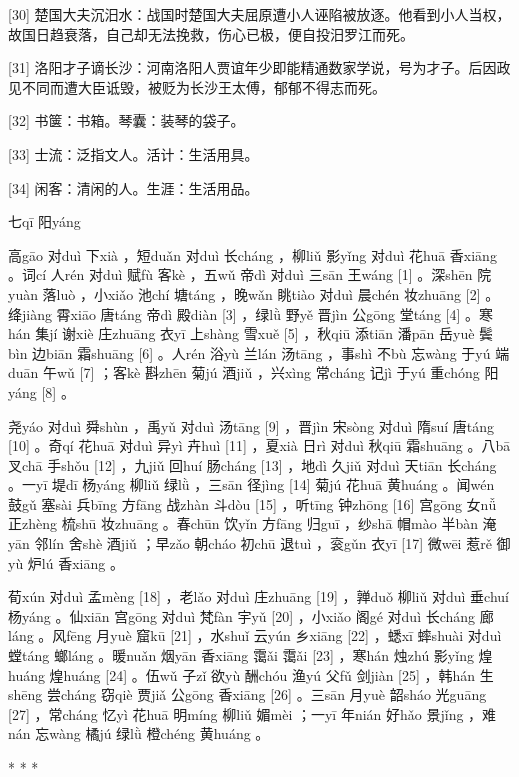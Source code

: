 \documentclass[12pt,UTF8]{ctexbook}
\begin{document}
[30] 楚国大夫沉汨水：战国时楚国大夫屈原遭小人诬陷被放逐。他看到小人当权，故国日趋衰落，自己却无法挽救，伤心已极，便自投汨罗江而死。

[31] 洛阳才子谪长沙：河南洛阳人贾谊年少即能精通数家学说，号为才子。后因政见不同而遭大臣诋毁，被贬为长沙王太傅，郁郁不得志而死。

[32] 书箧：书箱。琴囊：装琴的袋子。

[33] 士流：泛指文人。活计：生活用具。

[34] 闲客：清闲的人。生涯：生活用品。





七qī 阳yáng


高gāo 对duì 下xià ，短duǎn 对duì 长cháng ，柳liǔ 影yǐng 对duì 花huā 香xiāng 。词cí 人rén 对duì 赋fù 客kè ，五wǔ 帝dì 对duì 三sān 王wáng [1] 。深shēn 院yuàn 落luò ，小xiǎo 池chí 塘táng ，晚wǎn 眺tiào 对duì 晨chén 妆zhuāng [2] 。绛jiàng 霄xiāo 唐táng 帝dì 殿diàn [3] ，绿lǜ 野yě 晋jìn 公gōng 堂táng [4] 。寒hán 集jí 谢xiè 庄zhuāng 衣yī 上shàng 雪xuě [5] ，秋qiū 添tiān 潘pān 岳yuè 鬓bìn 边biān 霜shuāng [6] 。人rén 浴yù 兰lán 汤tāng ，事shì 不bù 忘wàng 于yú 端duān 午wǔ [7] ；客kè 斟zhēn 菊jú 酒jiǔ ，兴xìng 常cháng 记jì 于yú 重chóng 阳yáng [8] 。

尧yáo 对duì 舜shùn ，禹yǔ 对duì 汤tāng [9] ，晋jìn 宋sòng 对duì 隋suí 唐táng [10] 。奇qí 花huā 对duì 异yì 卉huì [11] ，夏xià 日rì 对duì 秋qiū 霜shuāng 。八bā 叉chā 手shǒu [12] ，九jiǔ 回huí 肠cháng [13] ，地dì 久jiǔ 对duì 天tiān 长cháng 。一yī 堤dī 杨yáng 柳liǔ 绿lǜ ，三sān 径jìng [14] 菊jú 花huā 黄huáng 。闻wén 鼓gǔ 塞sài 兵bīng 方fāng 战zhàn 斗dòu [15] ，听tīng 钟zhōng [16] 宫gōng 女nǚ 正zhèng 梳shū 妆zhuāng 。春chūn 饮yǐn 方fāng 归guī ，纱shā 帽mào 半bàn 淹yān 邻lín 舍shè 酒jiǔ ；早zǎo 朝cháo 初chū 退tuì ，衮gǔn 衣yī [17] 微wēi 惹rě 御yù 炉lú 香xiāng 。

荀xún 对duì 孟mèng [18] ，老lǎo 对duì 庄zhuāng [19] ，亸duǒ 柳liǔ 对duì 垂chuí 杨yáng 。仙xiān 宫gōng 对duì 梵fàn 宇yǔ [20] ，小xiǎo 阁gé 对duì 长cháng 廊láng 。风fēng 月yuè 窟kū [21] ，水shuǐ 云yún 乡xiāng [22] ，蟋xī 蟀shuài 对duì 螳táng 螂láng 。暖nuǎn 烟yān 香xiāng 霭ǎi 霭ǎi [23] ，寒hán 烛zhú 影yǐng 煌huáng 煌huáng [24] 。伍wǔ 子zǐ 欲yù 酬chóu 渔yú 父fǔ 剑jiàn [25] ，韩hán 生shēng 尝cháng 窃qiè 贾jiǎ 公gōng 香xiāng [26] 。三sān 月yuè 韶sháo 光guāng [27] ，常cháng 忆yì 花huā 明míng 柳liǔ 媚mèi ；一yī 年nián 好hǎo 景jǐng ，难nán 忘wàng 橘jú 绿lǜ 橙chéng 黄huáng 。



* * *
\end{document}
